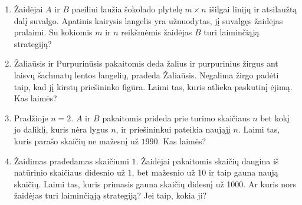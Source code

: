 \begin{enumerate}

\item Žaidėjai $A$ ir $B$ paeiliui laužia šokolado plytelę  $m\times n$ išilgai
  linijų ir atsilaužtą dalį suvalgo. Apatinis kairysis langelis yra
  užnuodytas, jį suvalgęs žaidėjas pralaimi. Su kokiomis $m$ ir $n$ reikšmėmis
  žaidėjas $B$ turi laiminčiąją strategiją? 


\item Žaliaūsis ir Purpurinūsis pakaitomis deda žalius ir purpurinius žirgus ant laisvų šachmatų lentos langelių, pradeda Žaliaūsis. Negalima žirgo padėti taip, kad jį kirstų priešininko figūra. Laimi tas, kuris atlieka paskutinį ėjimą. Kas laimės?


\item Pradžioje $n=2$. $A$ ir $B$ pakaitomis prideda prie turimo skaičiaus $n$ bet kokį jo daliklį, kuris nėra lygus $n$, ir priešininkui pateikia naująjį $n$. Laimi tas, kuris parašo skaičių ne mažesnį už $1990$. Kas laimės?


\item Žaidimas pradedamas skaičiumi $1$. Žaidėjai pakaitomis skaičių daugina iš natūrinio skaičiaus didesnio už $1$, bet mažesnio už 10 ir taip gauna naują skaičių. Laimi tas, kuris primasis gauna skaičių didesnį už 1000. Ar kuris nors žaidėjas turi laiminčiąją strategiją? Jei taip, kokia ji?  



\end{enumerate}
